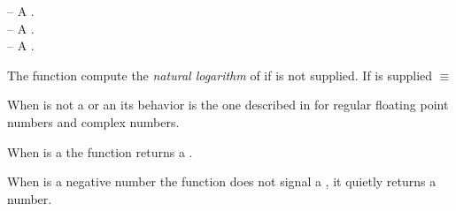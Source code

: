 \documentclass[../Comparisons-Predicates.tex]{subfiles}
\begin{document}

    \DSyntax{}

       \RArrow{} 

    \DArgsNValues{}

     -- A .\\
     -- A .\\
     -- A .

    \DDescription{}

    The function  compute the \emph{natural logarithm} of
     if  is not supplied. If  is
    supplied   \code{)} $\equiv$   \code{))}

    \noindent
    When  is not a  or an
     its behavior is the one described in
    \cite{1996:ANSIHyperSpec} for regular floating point numbers and complex
    numbers.

    \noindent
    When  is a  the function 
    returns a .

    \noindent
    When  is a negative 
    number the function  does not signal a
    , it quietly returns a
     number.
\end{document}
